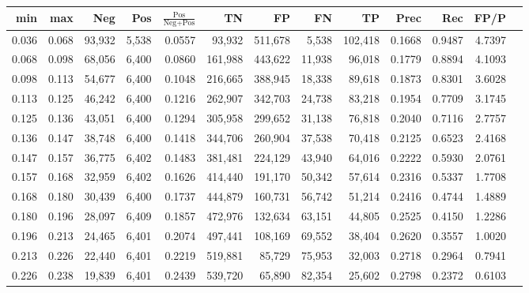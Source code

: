 \begin{tabular}{rrrrrrrrrrrrr}
\toprule
  min &   max &    Neg &   Pos & $\frac{\text{Pos}}{\text{Neg}+\text{Pos}}$ &      TN &      FP &      FN &      TP &   Prec &    Rec &   FP/P \\
\midrule
0.036 & 0.068 & 93,932 & 5,538 &                                     0.0557 &  93,932 & 511,678 &   5,538 & 102,418 & 0.1668 & 0.9487 & 4.7397 \\
0.068 & 0.098 & 68,056 & 6,400 &                                     0.0860 & 161,988 & 443,622 &  11,938 &  96,018 & 0.1779 & 0.8894 & 4.1093 \\
0.098 & 0.113 & 54,677 & 6,400 &                                     0.1048 & 216,665 & 388,945 &  18,338 &  89,618 & 0.1873 & 0.8301 & 3.6028 \\
0.113 & 0.125 & 46,242 & 6,400 &                                     0.1216 & 262,907 & 342,703 &  24,738 &  83,218 & 0.1954 & 0.7709 & 3.1745 \\
0.125 & 0.136 & 43,051 & 6,400 &                                     0.1294 & 305,958 & 299,652 &  31,138 &  76,818 & 0.2040 & 0.7116 & 2.7757 \\
0.136 & 0.147 & 38,748 & 6,400 &                                     0.1418 & 344,706 & 260,904 &  37,538 &  70,418 & 0.2125 & 0.6523 & 2.4168 \\
0.147 & 0.157 & 36,775 & 6,402 &                                     0.1483 & 381,481 & 224,129 &  43,940 &  64,016 & 0.2222 & 0.5930 & 2.0761 \\
0.157 & 0.168 & 32,959 & 6,402 &                                     0.1626 & 414,440 & 191,170 &  50,342 &  57,614 & 0.2316 & 0.5337 & 1.7708 \\
0.168 & 0.180 & 30,439 & 6,400 &                                     0.1737 & 444,879 & 160,731 &  56,742 &  51,214 & 0.2416 & 0.4744 & 1.4889 \\
0.180 & 0.196 & 28,097 & 6,409 &                                     0.1857 & 472,976 & 132,634 &  63,151 &  44,805 & 0.2525 & 0.4150 & 1.2286 \\
0.196 & 0.213 & 24,465 & 6,401 &                                     0.2074 & 497,441 & 108,169 &  69,552 &  38,404 & 0.2620 & 0.3557 & 1.0020 \\
0.213 & 0.226 & 22,440 & 6,401 &                                     0.2219 & 519,881 &  85,729 &  75,953 &  32,003 & 0.2718 & 0.2964 & 0.7941 \\
0.226 & 0.238 & 19,839 & 6,401 &                                     0.2439 & 539,720 &  65,890 &  82,354 &  25,602 & 0.2798 & 0.2372 & 0.6103 \\

\end{tabular}
